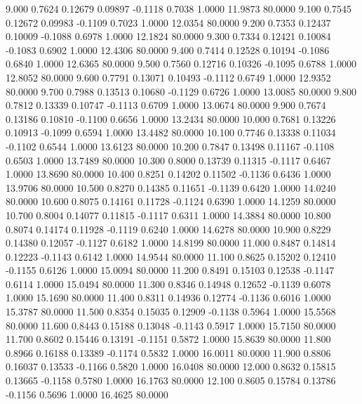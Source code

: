    9.000   0.7624   0.12679   0.09897  -0.1118   0.7038   1.0000  11.9873  80.0000
   9.100   0.7545   0.12672   0.09983  -0.1109   0.7023   1.0000  12.0354  80.0000
   9.200   0.7353   0.12437   0.10009  -0.1088   0.6978   1.0000  12.1824  80.0000
   9.300   0.7334   0.12421   0.10084  -0.1083   0.6902   1.0000  12.4306  80.0000
   9.400   0.7414   0.12528   0.10194  -0.1086   0.6840   1.0000  12.6365  80.0000
   9.500   0.7560   0.12716   0.10326  -0.1095   0.6788   1.0000  12.8052  80.0000
   9.600   0.7791   0.13071   0.10493  -0.1112   0.6749   1.0000  12.9352  80.0000
   9.700   0.7988   0.13513   0.10680  -0.1129   0.6726   1.0000  13.0085  80.0000
   9.800   0.7812   0.13339   0.10747  -0.1113   0.6709   1.0000  13.0674  80.0000
   9.900   0.7674   0.13186   0.10810  -0.1100   0.6656   1.0000  13.2434  80.0000
  10.000   0.7681   0.13226   0.10913  -0.1099   0.6594   1.0000  13.4482  80.0000
  10.100   0.7746   0.13338   0.11034  -0.1102   0.6544   1.0000  13.6123  80.0000
  10.200   0.7847   0.13498   0.11167  -0.1108   0.6503   1.0000  13.7489  80.0000
  10.300   0.8000   0.13739   0.11315  -0.1117   0.6467   1.0000  13.8690  80.0000
  10.400   0.8251   0.14202   0.11502  -0.1136   0.6436   1.0000  13.9706  80.0000
  10.500   0.8270   0.14385   0.11651  -0.1139   0.6420   1.0000  14.0240  80.0000
  10.600   0.8075   0.14161   0.11728  -0.1124   0.6390   1.0000  14.1259  80.0000
  10.700   0.8004   0.14077   0.11815  -0.1117   0.6311   1.0000  14.3884  80.0000
  10.800   0.8074   0.14174   0.11928  -0.1119   0.6240   1.0000  14.6278  80.0000
  10.900   0.8229   0.14380   0.12057  -0.1127   0.6182   1.0000  14.8199  80.0000
  11.000   0.8487   0.14814   0.12223  -0.1143   0.6142   1.0000  14.9544  80.0000
  11.100   0.8625   0.15202   0.12410  -0.1155   0.6126   1.0000  15.0094  80.0000
  11.200   0.8491   0.15103   0.12538  -0.1147   0.6114   1.0000  15.0494  80.0000
  11.300   0.8346   0.14948   0.12652  -0.1139   0.6078   1.0000  15.1690  80.0000
  11.400   0.8311   0.14936   0.12774  -0.1136   0.6016   1.0000  15.3787  80.0000
  11.500   0.8354   0.15035   0.12909  -0.1138   0.5964   1.0000  15.5568  80.0000
  11.600   0.8443   0.15188   0.13048  -0.1143   0.5917   1.0000  15.7150  80.0000
  11.700   0.8602   0.15446   0.13191  -0.1151   0.5872   1.0000  15.8639  80.0000
  11.800   0.8966   0.16188   0.13389  -0.1174   0.5832   1.0000  16.0011  80.0000
  11.900   0.8806   0.16037   0.13533  -0.1166   0.5820   1.0000  16.0408  80.0000
  12.000   0.8632   0.15815   0.13665  -0.1158   0.5780   1.0000  16.1763  80.0000
  12.100   0.8605   0.15784   0.13786  -0.1156   0.5696   1.0000  16.4625  80.0000
